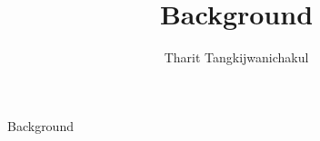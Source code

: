 \title{Background}
\author{Tharit Tangkijwanichakul}
\label{ch:chapter-background}

\maketitle
{}

Background